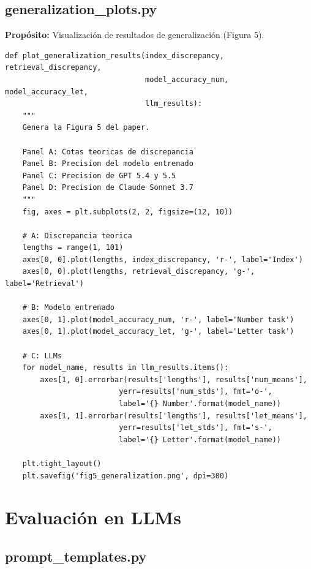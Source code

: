 \documentclass[12pt,a4paper]{report}
\begin{document}
\subsection{generalization\_plots.py}
\label{subsec:generalization_plots}

\textbf{Propósito:} Visualización de resultados de generalización (Figura 5).

\begin{lstlisting}
def plot_generalization_results(index_discrepancy, retrieval_discrepancy,
                                model_accuracy_num, model_accuracy_let,
                                llm_results):
    """
    Genera la Figura 5 del paper.
    
    Panel A: Cotas teoricas de discrepancia
    Panel B: Precision del modelo entrenado
    Panel C: Precision de GPT 5.4 y 5.5
    Panel D: Precision de Claude Sonnet 3.7
    """
    fig, axes = plt.subplots(2, 2, figsize=(12, 10))
    
    # A: Discrepancia teorica
    lengths = range(1, 101)
    axes[0, 0].plot(lengths, index_discrepancy, 'r-', label='Index')
    axes[0, 0].plot(lengths, retrieval_discrepancy, 'g-', label='Retrieval')
    
    # B: Modelo entrenado
    axes[0, 1].plot(model_accuracy_num, 'r-', label='Number task')
    axes[0, 1].plot(model_accuracy_let, 'g-', label='Letter task')
    
    # C: LLMs
    for model_name, results in llm_results.items():
        axes[1, 0].errorbar(results['lengths'], results['num_means'],
                          yerr=results['num_stds'], fmt='o-', 
                          label='{} Number'.format(model_name))
        axes[1, 1].errorbar(results['lengths'], results['let_means'],
                          yerr=results['let_stds'], fmt='s-',
                          label='{} Letter'.format(model_name))
    
    plt.tight_layout()
    plt.savefig('fig5_generalization.png', dpi=300)
\end{lstlisting}

\section{Evaluación en LLMs}
\label{sec:llm}

\subsection{prompt\_templates.py}
\label{subsec:prompt_templates}
\end{document}
